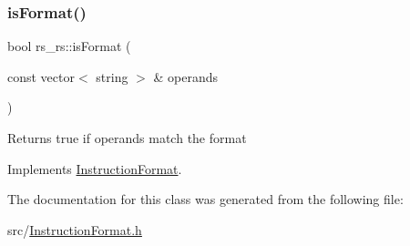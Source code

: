 \mbox{\label{classrs__rs_a1c8ae600e477053cc3eab27edebe6b53}} 
\subsubsection{\texorpdfstring{is\+Format()}{isFormat()}}
{\footnotesize\ttfamily bool rs\+\_\+rs\+::is\+Format (\begin{DoxyParamCaption}\item[{const vector$<$ string $>$ \&}]{operands }\end{DoxyParamCaption})\hspace{0.3cm}{\ttfamily [virtual]}}

Returns true if operands match the format 

Implements \hyperlink{classInstructionFormat_a9fdcf94dcd7d9a55ba86e7a63f04d1fe}{Instruction\+Format}.



The documentation for this class was generated from the following file\+:\begin{DoxyCompactItemize}
\item 
src/\hyperlink{InstructionFormat_8h}{Instruction\+Format.\+h}\end{DoxyCompactItemize}
